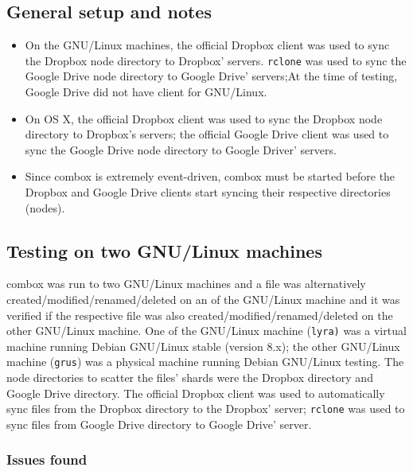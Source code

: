 \subsection{General setup and notes}

\begin{itemize}
\item On the GNU/Linux machines, the official Dropbox client was used
  to sync the Dropbox node directory to Dropbox'
  servers. \verb+rclone+\cite{program:rclone} was used to sync the
  Google Drive node directory to Google Drive' servers;At the time of
  testing, Google Drive did not have client for GNU/Linux.
\item On OS X, the official Dropbox client was used to sync the
  Dropbox node directory to Dropbox's servers; the official Google
  Drive client was used to sync the Google Drive node directory to
  Google Driver' servers.
\item Since combox is extremely event-driven, combox must be started
  before the Dropbox and Google Drive clients start syncing their
  respective directories (nodes).
\end{itemize}

\subsection{Testing on two GNU/Linux machines}

combox was run to two GNU/Linux machines and a file was alternatively
created/modified/renamed/deleted on an of the GNU/Linux machine and it
was verified if the respective file was also
created/modified/renamed/deleted on the other GNU/Linux machine. One
of the GNU/Linux machine (\verb+lyra)+ was a virtual machine running
Debian GNU/Linux stable (version 8.x); the other GNU/Linux machine
(\verb+grus+) was a physical machine running Debian GNU/Linux
testing. The node directories to scatter the files' shards were the
Dropbox directory and Google Drive directory. The official Dropbox
client was used to automatically sync files from the Dropbox directory
to the Dropbox' server; \verb+rclone+\cite{program:rclone} was used to
sync files from Google Drive directory to Google Drive' server.

\subsubsection{Issues found}\label{ch-5-2gnus-issues}

